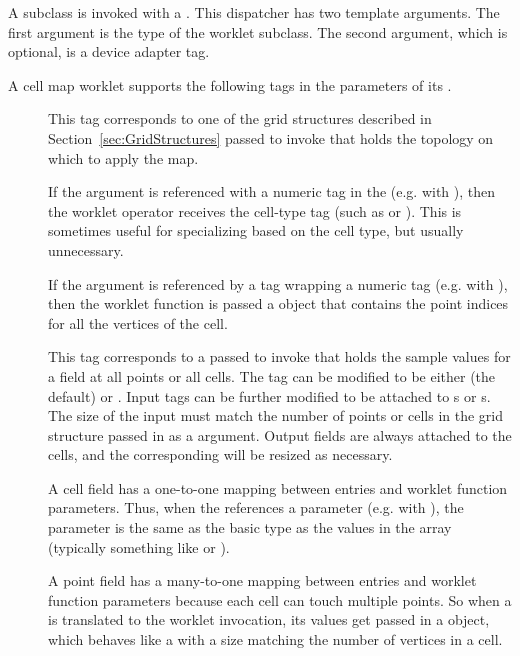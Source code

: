 A  subclass is invoked with a
. This dispatcher has two template
arguments. The first argument is the type of the worklet subclass. The
second argument, which is optional, is a device adapter tag.

A cell map worklet supports the following tags in the parameters of its
\controlsignature.
\begin{description}
\item[] This tag corresponds to one of the grid structures
  described in Section~\ref{sec:GridStructures} passed to invoke that holds
  the topology on which to apply the map.

  If the  argument is referenced with a numeric tag in the
  \executionsignature (e.g. with ), then the worklet operator
  receives the cell-type tag (such as  or
  ). This is sometimes useful for specializing   based
  on the cell type, but usually unnecessary.

  If the  argument is referenced by a 
  tag wrapping a numeric tag (e.g. with ), then
  the worklet function is passed a  object that
  contains the point indices for all the vertices of the cell.
\item[] This tag corresponds to a 
  passed to invoke that holds the sample values for a field at all points
  or all cells. The  tag can be modified to be either
   (the default) or . Input  tags can
  be further modified to be attached to s or
  s. The size of the input  must match
  the number of points or cells in the grid structure passed in as a
   argument.  Output fields are always attached to the
  cells, and the corresponding  will be resized as
  necessary.

  A cell field has a one-to-one mapping between 
  entries and worklet function parameters. Thus, when the
  \executionsignature references a \controlsignature {}
  parameter (e.g. with ), the parameter is the same as the
  basic type as the values in the array (typically something like
   or ).

  A point field has a many-to-one mapping between 
  entries and worklet function parameters because each cell can touch
  multiple points. So when a  is translated to the
  worklet invocation, its values get passed in a 
  object, which behaves like a  with a size matching the number
  of vertices in a cell.
\end{description}

